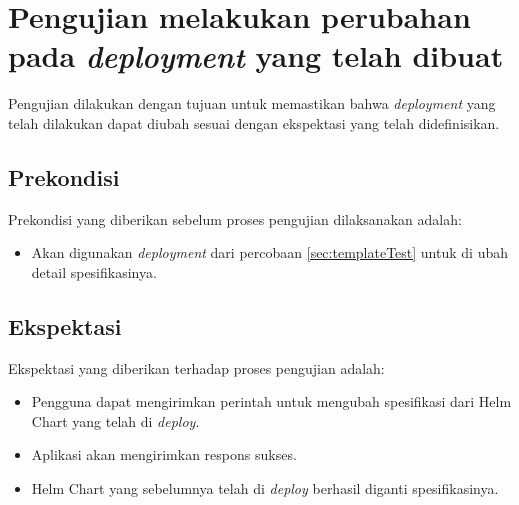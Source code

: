 \section{Pengujian melakukan perubahan pada \textit{deployment} yang telah dibuat}
Pengujian dilakukan dengan tujuan untuk memastikan bahwa \textit{deployment} yang telah dilakukan dapat diubah sesuai dengan ekspektasi yang telah didefinisikan.
\subsection{Prekondisi}
Prekondisi yang diberikan sebelum proses pengujian dilaksanakan adalah:
\begin{itemize}
    \item Akan digunakan \textit{deployment} dari percobaan \ref{sec:templateTest} untuk di ubah detail spesifikasinya.
\end{itemize}
\subsection{Ekspektasi}
Ekspektasi yang diberikan terhadap proses pengujian adalah:
\begin{itemize}
    \item Pengguna dapat mengirimkan perintah untuk mengubah spesifikasi dari Helm Chart yang telah di \textit{deploy}.
    \item Aplikasi akan mengirimkan respons sukses.
    \item Helm Chart yang sebelumnya telah di \textit{deploy} berhasil diganti spesifikasinya.
\end{itemize}
